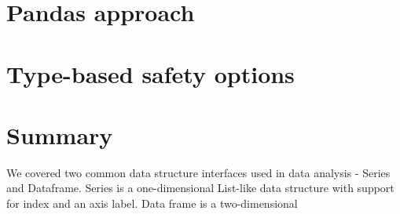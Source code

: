\section{Pandas approach} %


\section{Type-based safety options} %


\section*{Summary} %

We covered two common data structure interfaces used in data analysis - Series and Dataframe.
Series is a one-dimensional List-like data structure with support for index and an axis label.
Data frame is a two-dimensional 